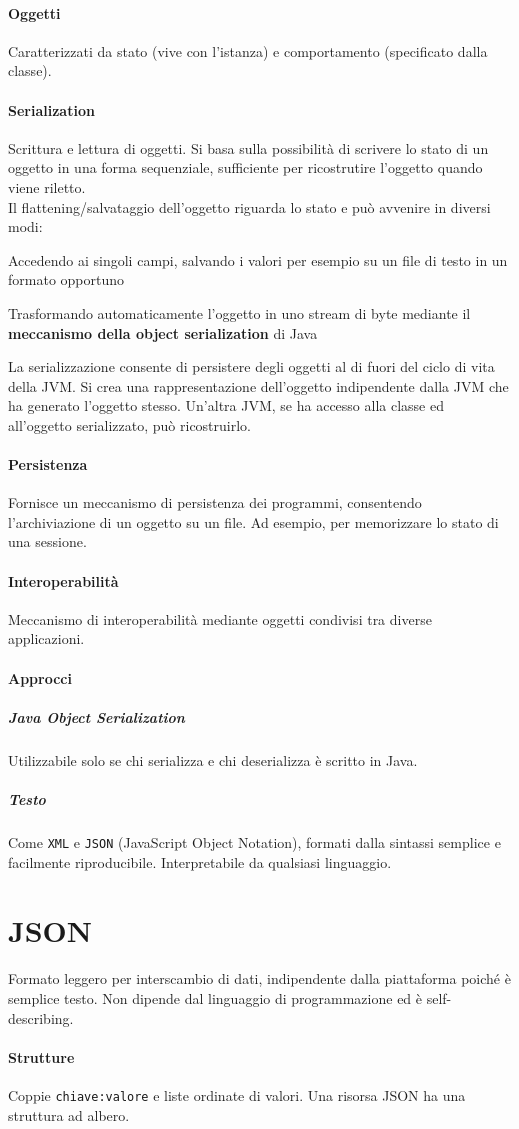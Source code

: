 \documentclass[10pt]{article}
\begin{document}
\paragraph{Oggetti} Caratterizzati da stato (vive con l'istanza) e comportamento (specificato dalla classe).
\paragraph{Serialization} Scrittura e lettura di oggetti. Si basa sulla possibilità di scrivere lo stato di un oggetto in una forma sequenziale, sufficiente per ricostrutire l'oggetto quando viene riletto.\\
Il flattening/salvataggio dell'oggetto riguarda lo stato e può avvenire in diversi modi:
\begin{list}{}{}
	\item Accedendo ai singoli campi, salvando i valori per esempio su un file di testo in un formato opportuno
	\item Trasformando automaticamente l'oggetto in uno stream di byte mediante il \textbf{meccanismo della object serialization} di Java
\end{list}
La serializzazione consente di persistere degli oggetti al di fuori del ciclo di vita della JVM. Si crea una rappresentazione dell'oggetto indipendente dalla JVM che ha generato l'oggetto stesso. Un'altra JVM, se ha accesso alla classe ed all'oggetto serializzato, può ricostruirlo.
\paragraph{Persistenza} Fornisce un meccanismo di persistenza dei programmi, consentendo l'archiviazione di un oggetto su un file. Ad esempio, per memorizzare lo stato di una sessione.
\paragraph{Interoperabilità} Meccanismo di interoperabilità mediante oggetti condivisi tra diverse applicazioni.
\paragraph{Approcci}
\subparagraph{Java Object Serialization} Utilizzabile solo se chi serializza e chi deserializza è scritto in Java.
\subparagraph{Testo} Come \texttt{XML} e \texttt{JSON} (JavaScript Object Notation), formati dalla sintassi semplice e facilmente riproducibile. Interpretabile da qualsiasi linguaggio.
\section{JSON}
Formato leggero per interscambio di dati, indipendente dalla piattaforma poiché è semplice testo. Non dipende dal linguaggio di programmazione ed è self-describing.
\paragraph{Strutture} Coppie \texttt{chiave:valore} e liste ordinate di valori. Una risorsa JSON ha una struttura ad albero.
\end{document}
